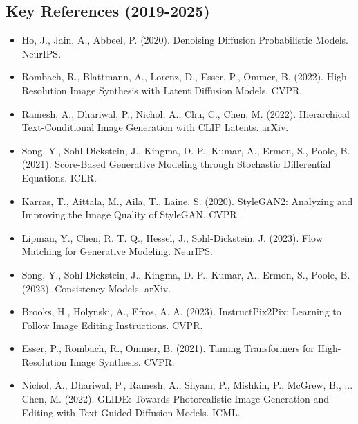\subsection*{Key References (2019-2025)}
\begin{itemize}
    \item Ho, J., Jain, A.,\textampersand{} Abbeel, P. (2020). Denoising Diffusion Probabilistic Models. NeurIPS.
    \item Rombach, R., Blattmann, A., Lorenz, D., Esser, P., \textampersand{} Ommer, B. (2022). High-Resolution Image Synthesis with Latent Diffusion Models. CVPR.
    \item Ramesh, A., Dhariwal, P., Nichol, A., Chu, C., \textampersand{} Chen, M. (2022). Hierarchical Text-Conditional Image Generation with CLIP Latents. arXiv.
    \item Song, Y., Sohl-Dickstein, J., Kingma, D. P., Kumar, A., Ermon, S., \textampersand{} Poole, B. (2021). Score-Based Generative Modeling through Stochastic Differential Equations. ICLR.
    \item Karras, T., Aittala, M., Aila, T., \textampersand{} Laine, S. (2020). StyleGAN2: Analyzing and Improving the Image Quality of StyleGAN. CVPR.
    \item Lipman, Y., Chen, R. T. Q., Hessel, J., \textampersand{} Sohl-Dickstein, J. (2023). Flow Matching for Generative Modeling. NeurIPS.
    \item Song, Y., Sohl-Dickstein, J., Kingma, D. P., Kumar, A., Ermon, S., \textampersand{} Poole, B. (2023). Consistency Models. arXiv.
    \item Brooks, H., Holynski, A., \textampersand{} Efros, A. A. (2023). InstructPix2Pix: Learning to Follow Image Editing Instructions. CVPR.
    \item Esser, P., Rombach, R., \textampersand{} Ommer, B. (2021). Taming Transformers for High-Resolution Image Synthesis. CVPR.
    \item Nichol, A., Dhariwal, P., Ramesh, A., Shyam, P., Mishkin, P., McGrew, B., ... \textampersand{} Chen, M. (2022). GLIDE: Towards Photorealistic Image Generation and Editing with Text-Guided Diffusion Models. ICML.
\end{itemize}

